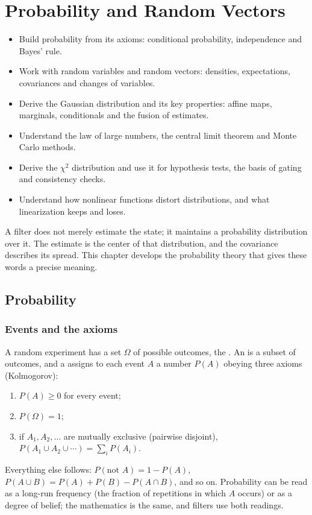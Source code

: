 \chapter{Probability and Random Vectors}
\label{ch:prob}

\begin{objectives}
\begin{itemize}
  \item Build probability from its axioms: conditional probability, independence and Bayes' rule.
  \item Work with random variables and random vectors: densities, expectations, covariances and changes of variables.
  \item Derive the Gaussian distribution and its key properties: affine maps, marginals, conditionals and the fusion of estimates.
  \item Understand the law of large numbers, the central limit theorem and Monte Carlo methods.
  \item Derive the $\chi^2$ distribution and use it for hypothesis tests, the basis of gating and consistency checks.
  \item Understand how nonlinear functions distort distributions, and what linearization keeps and loses.
\end{itemize}
\end{objectives}

A filter does not merely estimate the state; it maintains a probability distribution over it. The estimate is the center of
that distribution, and the covariance describes its spread. This chapter develops the probability theory that gives these words a
precise meaning.

\section{Probability}

\subsection{Events and the axioms}

A random experiment has a set $\Omega$ of possible outcomes, the . An  is a subset of outcomes, and a
 assigns to each event $A$ a number $P(A)$ obeying three axioms (Kolmogorov):
\begin{enumerate}
  \item $P(A) \ge 0$ for every event;
  \item $P(\Omega) = 1$;
  \item if $A_1, A_2, \dots$ are mutually exclusive (pairwise disjoint), $P(A_1\cup A_2\cup\cdots) = \sum_iP(A_i)$.
\end{enumerate}
Everything else follows: $P(\text{not }A) = 1 - P(A)$, $P(A\cup B) = P(A) + P(B) - P(A\cap B)$, and so on. Probability can be read as a
long-run frequency (the fraction of repetitions in which $A$ occurs) or as a degree of belief; the mathematics is the same, and filters
use both readings.

